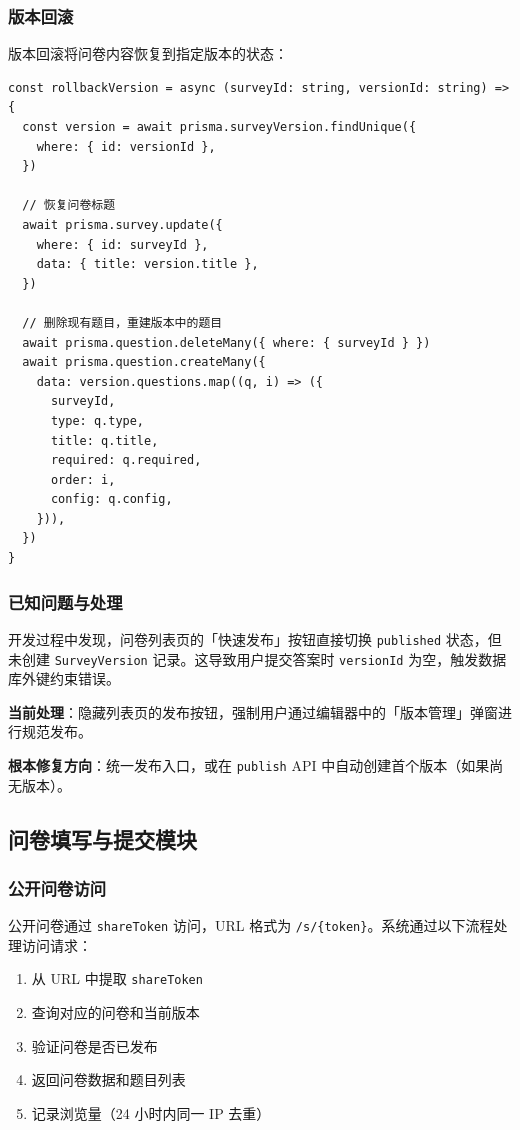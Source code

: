 \subsubsection{版本回滚}

版本回滚将问卷内容恢复到指定版本的状态：

\begin{verbatim}
const rollbackVersion = async (surveyId: string, versionId: string) => {
  const version = await prisma.surveyVersion.findUnique({
    where: { id: versionId },
  })
  
  // 恢复问卷标题
  await prisma.survey.update({
    where: { id: surveyId },
    data: { title: version.title },
  })
  
  // 删除现有题目，重建版本中的题目
  await prisma.question.deleteMany({ where: { surveyId } })
  await prisma.question.createMany({
    data: version.questions.map((q, i) => ({
      surveyId,
      type: q.type,
      title: q.title,
      required: q.required,
      order: i,
      config: q.config,
    })),
  })
}
\end{verbatim}

\subsubsection{已知问题与处理}

开发过程中发现，问卷列表页的「快速发布」按钮直接切换 \texttt{published} 状态，但未创建 \texttt{SurveyVersion} 记录。这导致用户提交答案时 \texttt{versionId} 为空，触发数据库外键约束错误。

\textbf{当前处理}：隐藏列表页的发布按钮，强制用户通过编辑器中的「版本管理」弹窗进行规范发布。

\textbf{根本修复方向}：统一发布入口，或在 \texttt{publish} API 中自动创建首个版本（如果尚无版本）。

\subsection{问卷填写与提交模块}

\subsubsection{公开问卷访问}

公开问卷通过 \texttt{shareToken} 访问，URL 格式为 \texttt{/s/\{token\}}。系统通过以下流程处理访问请求：

\begin{enumerate}[label=\textbf{\arabic*.}]
  \item 从 URL 中提取 \texttt{shareToken}
  \item 查询对应的问卷和当前版本
  \item 验证问卷是否已发布
  \item 返回问卷数据和题目列表
  \item 记录浏览量（24 小时内同一 IP 去重）
\end{enumerate}

